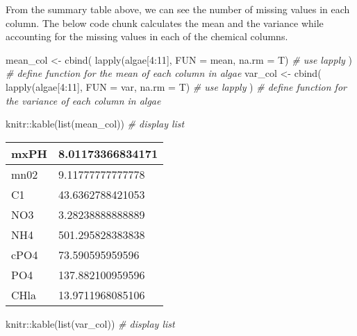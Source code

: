 \documentclass[
]{article}
\newenvironment{Shaded}{\begin{snugshade}}{\end{snugshade}}
\newcommand{\AttributeTok}[1]{\textcolor[rgb]{0.77,0.63,0.00}{#1}}
\newcommand{\CommentTok}[1]{\textcolor[rgb]{0.56,0.35,0.01}{\textit{#1}}}
\newcommand{\DecValTok}[1]{\textcolor[rgb]{0.00,0.00,0.81}{#1}}
\newcommand{\FunctionTok}[1]{\textcolor[rgb]{0.00,0.00,0.00}{#1}}
\newcommand{\NormalTok}[1]{#1}
\newcommand{\OtherTok}[1]{\textcolor[rgb]{0.56,0.35,0.01}{#1}}
\newcommand{\SpecialCharTok}[1]{\textcolor[rgb]{0.00,0.00,0.00}{#1}}
\begin{document}
From the summary table above, we can see the number of missing values in
each column. The below code chunk calculates the mean and the variance
while accounting for the missing values in each of the chemical columns.

\begin{Shaded}
\begin{Highlighting}[]
\NormalTok{mean\_col }\OtherTok{\textless{}{-}} \FunctionTok{cbind}\NormalTok{(}
  \FunctionTok{lapply}\NormalTok{(algae[}\DecValTok{4}\SpecialCharTok{:}\DecValTok{11}\NormalTok{], }\AttributeTok{FUN =}\NormalTok{ mean, }\AttributeTok{na.rm =}\NormalTok{ T) }\CommentTok{\# use lapply}
\NormalTok{) }\CommentTok{\# define function for the mean of each column in algae}
\NormalTok{var\_col }\OtherTok{\textless{}{-}} \FunctionTok{cbind}\NormalTok{(}
  \FunctionTok{lapply}\NormalTok{(algae[}\DecValTok{4}\SpecialCharTok{:}\DecValTok{11}\NormalTok{], }\AttributeTok{FUN =}\NormalTok{ var, }\AttributeTok{na.rm =}\NormalTok{ T) }\CommentTok{\# use lapply}
\NormalTok{) }\CommentTok{\# define function for the variance of each column in algae}

\NormalTok{knitr}\SpecialCharTok{::}\FunctionTok{kable}\NormalTok{(}\FunctionTok{list}\NormalTok{(mean\_col)) }\CommentTok{\# display list}
\end{Highlighting}
\end{Shaded}

\begin{table}

\centering
\begin{tabular}[t]{l|l}
\hline
mxPH & 8.01173366834171\\
\hline
mn02 & 9.11777777777778\\
\hline
C1 & 43.6362788421053\\
\hline
NO3 & 3.28238888888889\\
\hline
NH4 & 501.295828383838\\
\hline
cPO4 & 73.590595959596\\
\hline
PO4 & 137.882100959596\\
\hline
CHla & 13.9711968085106\\
\hline
\end{tabular}
\end{table}

\begin{Shaded}
\begin{Highlighting}[]
\NormalTok{knitr}\SpecialCharTok{::}\FunctionTok{kable}\NormalTok{(}\FunctionTok{list}\NormalTok{(var\_col)) }\CommentTok{\# display list}
\end{Highlighting}
\end{Shaded}
\end{document}
